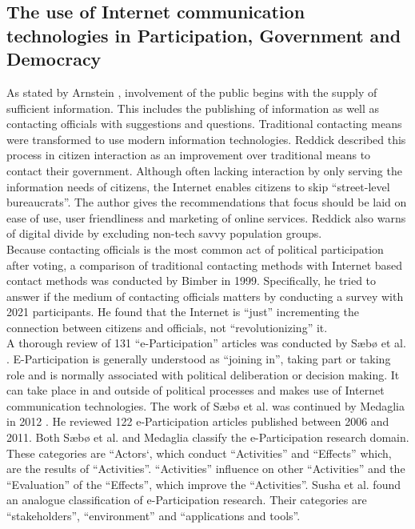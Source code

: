 \subsection{The use of Internet communication technologies in Participation, Government and Democracy}
As stated by Arnstein \cite{Arnstein1969_citizen_participation}, involvement of the public begins with the supply of sufficient information. This includes the publishing of information as well as contacting officials with suggestions and questions. Traditional contacting means were transformed to use modern information technologies. Reddick \cite{Reddick2005_Citizen_interaction_with_egovernment} described this process in citizen interaction as an improvement over traditional means to contact their government. Although often lacking interaction by only serving the information needs of citizens, the Internet enables citizens to skip ``street-level bureaucrats''. The author gives the recommendations that focus should be laid on ease of use, user friendliness and marketing of online services. Reddick also warns of digital divide by excluding non-tech savvy population groups.\\
Because contacting officials is the most common act of political participation after voting, a comparison of traditional contacting methods with Internet based contact methods was conducted by Bimber \cite{Bimber1999_Citizen_communication_with_government} in 1999. Specifically, he tried to answer if the medium of contacting officials matters by conducting a survey with 2021 participants. He found that the Internet is ``just'' incrementing the connection between citizens and officials, not ``revolutionizing'' it.\\
A thorough review of 131 ``e-Participation'' articles was conducted by S{\ae}b{\o} et al. \cite{Saebo_eParticipation}. E-Participation is generally understood as ``joining in'', taking part or taking role and is normally associated with political deliberation or decision making. It can take place in and outside of political processes and makes use of Internet communication technologies. The work of S{\ae}b{\o} et al. was continued by Medaglia in 2012 \cite{Medaglia2012_eParticipation}. He reviewed 122 e-Participation articles published between 2006 and 2011. Both S{\ae}b{\o} et al. and Medaglia classify the e-Participation research domain. These categories are ``Actors`, which conduct ``Activities'' and ``Effects'' which, are the results of ``Activities''. ``Activities'' influence on other ``Activities'' and the ``Evaluation'' of the ``Effects'', which improve the ``Activities''. Susha et al. \cite{Susha2012_eParticipation} found an analogue classification of e-Participation research. Their categories are ``stakeholders'', ``environment'' and ``applications and tools''.\\
